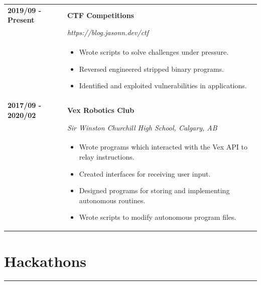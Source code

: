 \documentclass[letterpaper]{article}
\newcommand{\sect}[1]{\section*{#1}
                        {\color{cyan}
                        \rule{\textwidth}{1pt}
                        \vspace{-1ex}}}
\begin{document}
        \begin{tabular}{p{} p{}} 
            \textbf{2019/09 - Present} & \large\textbf{CTF Competitions} \\
            & \emph{https://blog.jasonn.dev/ctf} \\
            & \begin{itemize}
                \item Wrote scripts to solve challenges under pressure.
                \item Reversed engineered stripped binary programs.
                \item Identified and exploited vulnerabilities in applications. 
            \end{itemize}
            \\
            \textbf{2017/09 - 2020/02} & \large\textbf{Vex Robotics Club} \\
            & \emph{Sir Winston Churchill High School, Calgary, AB} \\
            & \begin{itemize}
                \item Wrote programs which interacted with the Vex API to relay instructions.
                \item Created interfaces for receiving user input.
                \item Designed programs for storing and implementing autonomous routines.
                \item Wrote scripts to modify autonomous program files.
            \end{itemize}
        \end{tabular}

    \sect{Hackathons}
\end{document}
